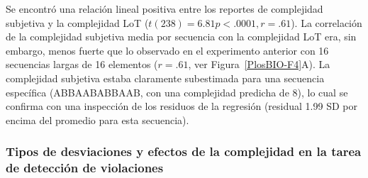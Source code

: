 
Se encontró una relación lineal positiva entre los reportes de complejidad subjetiva y la complejidad LoT ($t(238) = 6.81 p <.0001 , r = .61$). La correlación de la complejidad subjetiva media por secuencia con la complejidad LoT era, sin embargo, menos fuerte que lo observado en el experimento anterior con 16 secuencias largas de 16 elementos ($r = .61$, ver Figura~\ref{PlosBIO-F4}A). La complejidad subjetiva estaba claramente subestimada para una secuencia específica (ABBAABABBAAB, con una complejidad predicha de 8), lo cual se confirma con una inspección de los residuos de la regresión (residual 1.99 SD por encima del promedio para esta secuencia).

\subsubsection{Tipos de desviaciones y efectos de la complejidad en la tarea de detección de violaciones}


